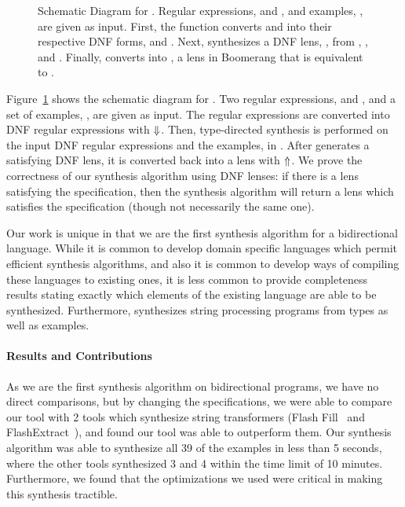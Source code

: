 \documentclass[a4paper,twoside]{article}
\begin{document}
\begin{figure}
\begin{tikzpicture}[auto,node distance=1.5cm]
  \end{tikzpicture}
  \caption{Schematic Diagram for \Optician{}.  Regular expressions, \Regex{} and
    \RegexAlt{}, and examples, \Examples{}, are given as input.
    First, the function \ToDNFRegex{} converts \Regex{} and \RegexAlt{} into
    their respective DNF forms, \DNFRegex{} and \DNFRegexAlt{}.
    Next, \SynthDNFLens{} synthesizes a DNF lens, \DNFLens{}, from \Regex{},
    \RegexAlt{}, and \Examples{}.
    Finally, \ToLens{} converts \DNFLens{} into \Lens{}, a lens in Boomerang
    that is equivalent to \DNFLens{}.}
  \label{fig:schematic-diagram-synthesis}
\end{figure}

Figure~\ref{fig:schematic-diagram-synthesis} shows the schematic diagram for
\Optician{}.  Two regular expressions, \Regex{} and \RegexAlt{}, and a set of
examples, \Examples{}, are given as input.  The regular expressions are
converted into DNF regular expressions with $\ToDNFRegex$.  Then, type-directed
synthesis is performed on the input DNF regular expressions and the examples, in
\SynthDNFLens{}.  After \SynthDNFLens{} generates a satisfying DNF lens, it is
converted back into a lens with $\ToRegex$.  We prove the correctness of our
synthesis algorithm using DNF lenses: if there is a lens satisfying the
specification, then the synthesis algorithm will return a lens which satisfies
the specification (though not necessarily the same one).

Our work is unique in that we are the first synthesis algorithm for a
bidirectional language.  While it is common to develop domain specific languages
which permit efficient synthesis algorithms, and also it is common to develop
ways of compiling these languages to existing ones, it is less common to provide
completeness results stating exactly which elements of the existing language are
able to be synthesized.  Furthermore, \Optician{} synthesizes string processing
programs from types as well as examples. 

\paragraph*{Results and Contributions}
As we are the first synthesis algorithm on bidirectional programs, we have no
direct comparisons, but by changing the specifications, we were able to compare
our tool with 2 tools which synthesize string transformers (Flash Fill~\cite{gulwani-popl-2014} and
FlashExtract~\cite{le-pldi-2014}), and found our tool 
was able to outperform them.
Our synthesis algorithm was able to synthesize all 39
of the examples in less than 5 seconds, where the other tools synthesized 3 and
4 within the time limit of 10 minutes.
Furthermore, we found that the optimizations we used were critical in making
this synthesis tractible.  
\end{document}
